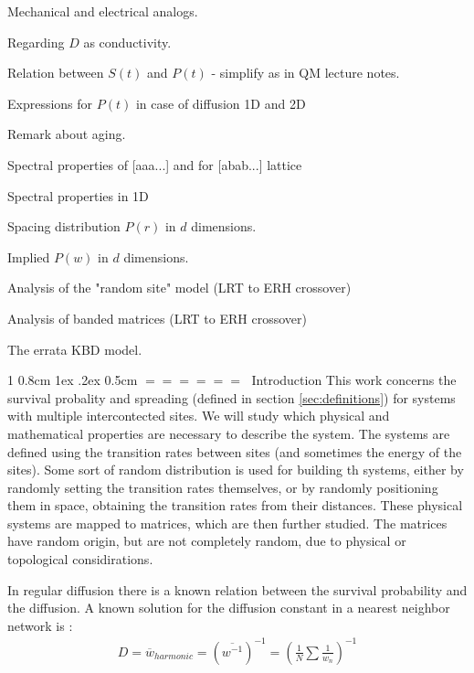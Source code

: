 \documentclass[onecolumn,fleqn,notitlepage,secnumarabic]{revtex4}
\makeatletter
\def\section{%
  \@startsection
    {section}%
    {1}%
    {\z@}%
    {0.8cm \@plus1ex \@minus .2ex}%
    {0.5cm}%
    {\Large\bf $=\!=\!=\!=\!=\!=\;$}%
}%
\makeatother
\begin{document}
Mechanical and electrical analogs.

Regarding $D$ as conductivity.

Relation between $S(t)$ and $P(t)$ - simplify as in QM lecture notes.

Expressions for $P(t)$ in case of diffusion 1D and 2D

Remark about aging.

Spectral properties of [aaa...] and for [abab...] lattice

Spectral properties in 1D

Spacing distribution $P(r)$ in $d$ dimensions.

Implied $P(w)$ in $d$ dimensions. 

Analysis of the "random site" model (LRT to ERH crossover) 

Analysis of banded matrices (LRT to ERH crossover)

The errata KBD model. 



\clearpage


\section{Introduction}
This work concerns the survival probality and spreading (defined in section \ref{sec:definitions}) for systems with multiple intercontected sites. We will study which physical and mathematical properties are necessary to describe the system. The systems are defined using the transition rates between sites (and sometimes the energy of the sites). Some sort of random distribution is used for building th systems, either by randomly setting the transition rates themselves, or by randomly positioning them in space, obtaining the transition rates from their distances. These physical systems are mapped to matrices, which are then further studied. The matrices have random origin, but are not completely random, due to physical or topological considirations.


In regular diffusion there is a known relation between the survival probability and the diffusion. 
A known solution for the diffusion constant in a nearest neighbor network is \cite{Derrida:1983}:
\begin{align}
D=\overline{w}_{harmonic} =(\overline{w^{-1}})^{-1}=\left(\frac{1}{N}\sum\frac{1}{w_n}\right)^{-1}
\end{align}
\end{document}
